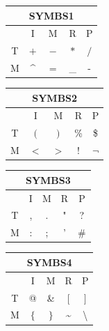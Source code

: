 \documentclass{article}
\begin{document}
\begin{center}
	\begin{table}[!h]
		\begin{subtable}{0.45\textwidth}
			\centering
			\begin{tabular}{|c|c|c|c|c|}
				\hline
				\multicolumn{5}{|c|}{SYMBS1}\\ \hline
				& I & M & R & P \\ \hline
				T & $+$ & $-$ & $*$ & $/$ \\ \hline
				M & \textasciicircum & $=$ & \_ & - \\ \hline
			\end{tabular}
		\end{subtable}
		\begin{subtable}{0.45\textwidth}
			\centering
			\begin{tabular}{|c|c|c|c|c|}
				\hline
				\multicolumn{5}{|c|}{SYMBS2}\\ \hline
				& I & M & R & P \\ \hline
				T & $($ & $)$ & \% & \$ \\ \hline
				M & $<$ & $>$ & ! & $\neg$ \\ \hline
			\end{tabular}
		\end{subtable}
	\end{table}
\end{center}

\begin{center}
	\begin{table}[!h]
		\begin{subtable}{0.45\textwidth}
			\centering
			\begin{tabular}{|c|c|c|c|c|}
				\hline
				\multicolumn{5}{|c|}{SYMBS3}\\ \hline
				& I & M & R & P \\ \hline
				T & , & . & " & ? \\ \hline
				M & : & ; & ' & \# \\ \hline
			\end{tabular}
		\end{subtable}
		\begin{subtable}{0.45\textwidth}
			\centering
			\begin{tabular}{|c|c|c|c|c|}
				\hline
				\multicolumn{5}{|c|}{SYMBS4}\\ \hline
				& I & M & R & P \\ \hline
				T & @ & \& & $[$ & $]$ \\ \hline
				M & $\{$ & $\}$ & \textasciitilde & \textbackslash \\ \hline
			\end{tabular}
		\end{subtable}
	\end{table}
\end{center}
\end{document}
